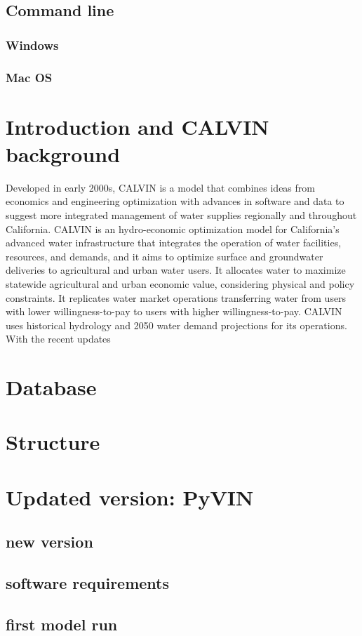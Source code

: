 \documentclass[12pt]{article}%
\begin{document}
\subsection{Command line}
%
\subsubsection{Windows}
%
\subsubsection{Mac OS}
%
\pagebreak
%
\section{Introduction and CALVIN background}
Developed in early 2000s, CALVIN is a model that combines ideas from economics and engineering optimization with advances in software and data to suggest more integrated management of water supplies regionally and throughout California. CALVIN is an hydro-economic optimization model for California's advanced water infrastructure that integrates the operation of water facilities, resources, and demands, and it aims to optimize surface and groundwater deliveries to agricultural and urban water users. It allocates water to maximize statewide agricultural and urban economic value, considering physical and policy constraints. It replicates water market operations transferring water from users with lower willingness-to-pay to users with higher willingness-to-pay. CALVIN uses historical hydrology and 2050 water demand projections for its operations. \\
With the recent updates
%
\section{Database}
%
\section{Structure}
%
\section{Updated version: PyVIN}
%
\subsection{new version}
%
\subsection{software requirements}
%
\subsection{first model run}
\end{document}
